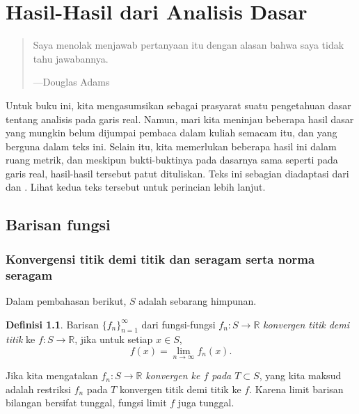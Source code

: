 \documentclass[12pt,openany]{book}
\newcommand{\R}{{\mathbb{R}}}
\newcommand{\myindex}[1]{#1\index{#1}}
\theoremstyle{plain}
\theoremstyle{remark}
\theoremstyle{definition}
\newtheorem{defn}[thm]{Definisi}
\newenvironment{myepigraph}{%
    \begin{quote}%
    \begingroup\itshape
}{%
    \endgroup%
    \end{quote}
}
\theoremstyle{exercise}
\theoremstyle{example}
\begin{document}
\chapter{Hasil-Hasil dari Analisis Dasar} \label{ap:basicanal}

\begin{myepigraph}
Saya menolak menjawab pertanyaan itu dengan alasan bahwa saya tidak tahu
jawabannya.

---Douglas Adams
\end{myepigraph}

Untuk buku ini,
kita mengasumsikan sebagai prasyarat suatu pengetahuan dasar tentang analisis pada garis real.
Namun, mari kita meninjau beberapa hasil dasar yang mungkin belum
dijumpai pembaca dalam kuliah semacam itu, dan yang berguna dalam teks ini.  Selain itu,
kita memerlukan beberapa hasil ini dalam ruang metrik, dan meskipun bukti-buktinya
pada dasarnya sama seperti pada garis real, hasil-hasil tersebut patut dituliskan.
Teks ini sebagian diadaptasi dari \cite{ra:book} dan \cite{ra:book2}.
Lihat kedua teks tersebut untuk perincian lebih lanjut.


\section{Barisan fungsi}
\label{sec:puconv}

\subsection{Konvergensi titik demi titik dan seragam serta norma seragam}

Dalam pembahasan berikut, $S$ adalah sebarang himpunan.

\begin{defn}
Barisan
$\{ f_n \}_{n=1}^\infty$ dari fungsi-fungsi $f_n \colon S \to \R$
\emph{\myindex{konvergen titik demi titik}} ke $f \colon S \to \R$, jika untuk setiap $x
\in S$,
\begin{equation*}
f(x) =
\lim_{n\to\infty} f_n(x) .
\end{equation*}
\end{defn}

Jika kita mengatakan $f_n \colon S \to \R$
\emph{konvergen ke $f$ pada $T \subset S$},
yang kita maksud adalah
restriksi $f_n$ pada $T$ konvergen titik demi titik ke $f$.
Karena limit barisan bilangan bersifat tunggal, fungsi limit $f$ juga tunggal.
\end{document}
